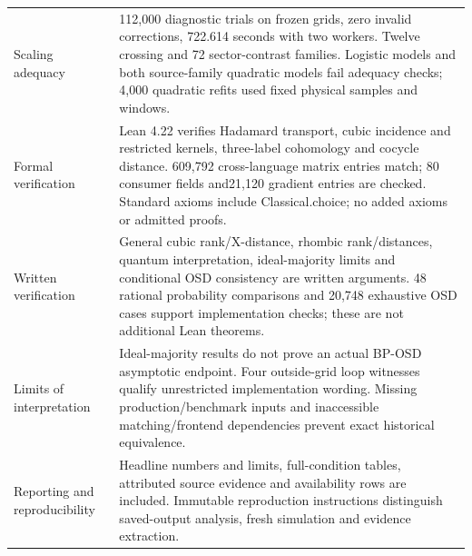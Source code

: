 \begin{longtable}{p{.23\linewidth}p{.69\linewidth}}
Scaling adequacy & 112,000 diagnostic trials on frozen grids, zero invalid corrections, 722.614 seconds with two workers. Twelve crossing and 72 sector-contrast families. Logistic models and both source-family quadratic models fail adequacy checks; 4,000 quadratic refits used fixed physical samples and windows.\\
Formal verification & Lean 4.22 verifies Hadamard transport, cubic incidence and restricted kernels, three-label cohomology and cocycle distance. 609,792 cross-language matrix entries match; 80 consumer fields and21,120 gradient entries are checked. Standard axioms include Classical.choice; no added axioms or admitted proofs.\\
Written verification & General cubic rank/X-distance, rhombic rank/distances, quantum interpretation, ideal-majority limits and conditional OSD consistency are written arguments. 48 rational probability comparisons and 20,748 exhaustive OSD cases support implementation checks; these are not additional Lean theorems.\\
Limits of interpretation & Ideal-majority results do not prove an actual BP-OSD asymptotic endpoint. Four outside-grid loop witnesses qualify unrestricted implementation wording. Missing production/benchmark inputs and inaccessible matching/frontend dependencies prevent exact historical equivalence.\\
Reporting and reproducibility & Headline numbers and limits, full-condition tables, attributed source evidence and availability rows are included. Immutable reproduction instructions distinguish saved-output analysis, fresh simulation and evidence extraction.\\
\bottomrule\end{longtable}
